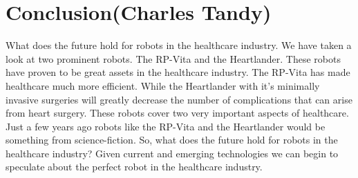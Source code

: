 \documentclass[11pt,conference]{IEEEtran}
\begin{document}
\section{Conclusion(Charles Tandy)}

\indent What does the future hold for robots in the healthcare industry. We have taken a look at two prominent robots. The RP-Vita and the Heartlander. These robots have proven to be great assets in the healthcare industry. The RP-Vita has made healthcare much more efficient. While the Heartlander with it's minimally invasive surgeries will greatly decrease the number of complications that can arise from heart surgery. These robots cover two very important aspects of healthcare. Just a few years ago robots like the RP-Vita and the Heartlander would be something from science-fiction. So, what does the future hold for robots in the healthcare industry?
\newline
\indent Given current and emerging technologies we can begin to speculate about the perfect robot in the healthcare industry. 
\end{document}

